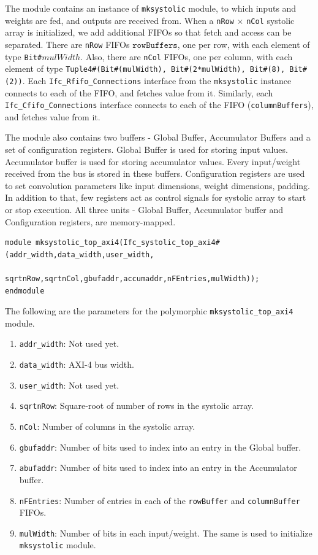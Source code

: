 \documentclass{article}
\begin{document}
The module contains an instance of \texttt{mksystolic} module, to which inputs and weights are fed, and outputs are received from. When a \texttt{nRow} $\times$ \texttt{nCol} systolic array is initialized, we add additional FIFOs so that fetch and access can be separated. There are \texttt{nRow} FIFOs \(\texttt{rowBuffers}\), one per row, with each element of type \texttt{Bit\#\(mulWidth\)}. Also, there are \texttt{nCol} FIFOs, one per column, with each element of type \texttt{Tuple4\#(Bit\#(mulWidth), Bit\#(2*mulWidth), Bit\#(8), Bit\#(2))}. Each \texttt{Ifc\_Rfifo\_Connections} interface from the \texttt{mksystolic} instance connects to each of the FIFO, and fetches value from it. Similarly, each \texttt{Ifc\_Cfifo\_Connections} interface connects to each of the FIFO (\texttt{columnBuffers}), and fetches value from it. 

The module also contains two buffers - Global Buffer, Accumulator Buffers and a set of configuration registers. Global Buffer is used for storing input values. Accumulator buffer is used for storing accumulator values. Every input/weight received from the bus is stored in these buffers. Configuration registers are used to set convolution parameters like input dimensions, weight dimensions, padding. In addition to that, few registers act as control signals for systolic array to start or stop execution. All three units - Global Buffer, Accumulator buffer and Configuration registers, are memory-mapped.

\begin{verbatim}
module mksystolic_top_axi4(Ifc_systolic_top_axi4#(addr_width,data_width,user_width,
                          sqrtnRow,sqrtnCol,gbufaddr,accumaddr,nFEntries,mulWidth));
endmodule
\end{verbatim}

The following are the parameters for the polymorphic \texttt{mksystolic\_top\_axi4} module.
\begin{enumerate}
  \item \texttt{addr\_width}: Not used yet.
  \item \texttt{data\_width}: AXI-4 bus width.
  \item \texttt{user\_width}: Not used yet.
  \item \texttt{sqrtnRow}: Square-root of number of rows in the systolic array.
  \item \texttt{nCol}: Number of columns in the systolic array.
  \item \texttt{gbufaddr}: Number of bits used to index into an entry in the Global buffer.
  \item \texttt{abufaddr}: Number of bits used to index into an entry in the Accumulator buffer.
  \item \texttt{nFEntries}: Number of entries in each of the \texttt{rowBuffer} and \texttt{columnBuffer} FIFOs. 
  \item \texttt{mulWidth}: Number of bits in each input/weight. The same is used to initialize \texttt{mksystolic} module.
\end{enumerate}
\end{document}
